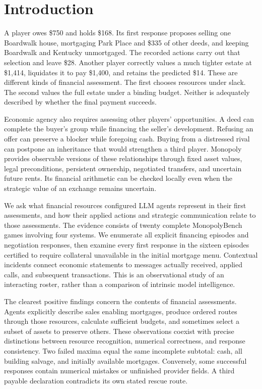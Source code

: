\section{Introduction}

A player owes \$750 and holds \$168. Its first response proposes selling one Boardwalk house, mortgaging Park Place and \$335 of other deeds, and keeping Boardwalk and Kentucky unmortgaged. The recorded actions carry out that selection and leave \$28. Another player correctly values a much tighter estate at \$1,414, liquidates it to pay \$1,400, and retains the predicted \$14. These are different kinds of financial assessment. The first chooses resources under slack. The second values the full estate under a binding budget. Neither is adequately described by whether the final payment succeeds.

Economic agency also requires assessing other players' opportunities. A deed can complete the buyer's group while financing the seller's development. Refusing an offer can preserve a blocker while foregoing cash. Buying from a distressed rival can postpone an inheritance that would strengthen a third player. Monopoly provides observable versions of these relationships through fixed asset values, legal preconditions, persistent ownership, negotiated transfers, and uncertain future rents. Its financial arithmetic can be checked locally even when the strategic value of an exchange remains uncertain.

We ask what financial resources configured LLM agents represent in their first assessments, and how their applied actions and strategic communication relate to those assessments. The evidence consists of twenty complete MonopolyBench games involving four systems. We enumerate all explicit financing episodes and negotiation responses, then examine every first response in the sixteen episodes certified to require collateral unavailable in the initial mortgage menu. Contextual incidents connect economic statements to messages actually received, applied calls, and subsequent transactions. This is an observational study of an interacting roster, rather than a comparison of intrinsic model intelligence.

The clearest positive findings concern the contents of financial assessments. Agents explicitly describe sales enabling mortgages, produce ordered routes through those resources, calculate sufficient budgets, and sometimes select a subset of assets to preserve others. These observations coexist with precise distinctions between resource recognition, numerical correctness, and response consistency. Two failed maxima equal the same incomplete subtotal: cash, all building salvage, and initially available mortgages. Conversely, some successful responses contain numerical mistakes or unfinished provider fields. A third payable declaration contradicts its own stated rescue route.

